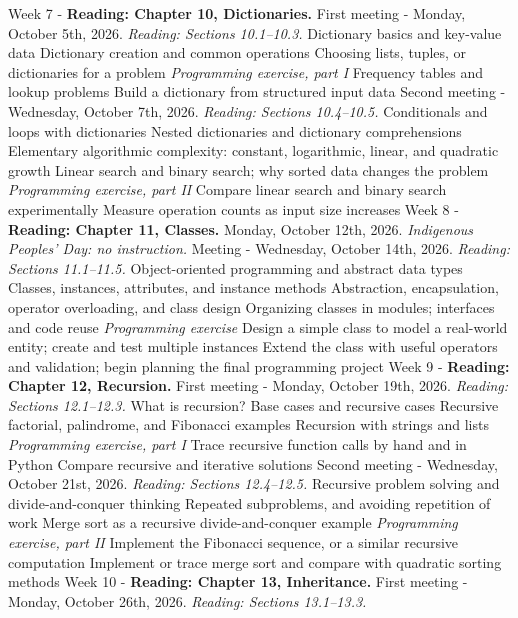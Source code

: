 \documentclass[10pt]{article}
\begin{document}
\begin{outline}[enumerate]
\1 Week 7 - \textbf{Reading: Chapter 10, Dictionaries.}
\2 First meeting - Monday, October 5th, 2026. \textit{Reading: Sections 10.1--10.3.}
\3 Dictionary basics and key-value data
\3 Dictionary creation and common operations
\3 Choosing lists, tuples, or dictionaries for a problem
\3 \textit{Programming exercise, part I}
\4 Frequency tables and lookup problems
\4 Build a dictionary from structured input data
\2 Second meeting - Wednesday, October 7th, 2026. \textit{Reading: Sections 10.4--10.5.}
\3 Conditionals and loops with dictionaries
\3 Nested dictionaries and dictionary comprehensions
\3 Elementary algorithmic complexity: constant, logarithmic, linear, and quadratic growth
\3 Linear search and binary search; why sorted data changes the problem
\3 \textit{Programming exercise, part II}
\4 Compare linear search and binary search experimentally
\4 Measure operation counts as input size increases
\1 Week 8 - \textbf{Reading: Chapter 11, Classes.}
\2 Monday, October 12th, 2026. \textit{Indigenous Peoples' Day: no instruction.}
\2 Meeting - Wednesday, October 14th, 2026. \textit{Reading: Sections 11.1--11.5.}
\3 Object-oriented programming and abstract data types
\3 Classes, instances, attributes, and instance methods
\3 Abstraction, encapsulation, operator overloading, and class design
\3 Organizing classes in modules; interfaces and code reuse
\3 \textit{Programming exercise}
\4 Design a simple class to model a real-world entity; create and test multiple instances
\4 Extend the class with useful operators and validation; begin planning the final programming project
\1 Week 9 - \textbf{Reading: Chapter 12, Recursion.}
\2 First meeting - Monday, October 19th, 2026. \textit{Reading: Sections 12.1--12.3.}
\3 What is recursion? Base cases and recursive cases
\3 Recursive factorial, palindrome, and Fibonacci examples
\3 Recursion with strings and lists
\3 \textit{Programming exercise, part I}
\4 Trace recursive function calls by hand and in Python
\4 Compare recursive and iterative solutions
\2 Second meeting - Wednesday, October 21st, 2026. \textit{Reading: Sections 12.4--12.5.}
\3 Recursive problem solving and divide-and-conquer thinking
\3 Repeated subproblems, and avoiding repetition of work
\3 Merge sort as a recursive divide-and-conquer example
\3 \textit{Programming exercise, part II}
\4 Implement the Fibonacci sequence, or a similar recursive computation
\4 Implement or trace merge sort and compare with quadratic sorting methods
\1 Week 10 - \textbf{Reading: Chapter 13, Inheritance.}
\2 First meeting - Monday, October 26th, 2026. \textit{Reading: Sections 13.1--13.3.}

\end{outline}
\end{document}
